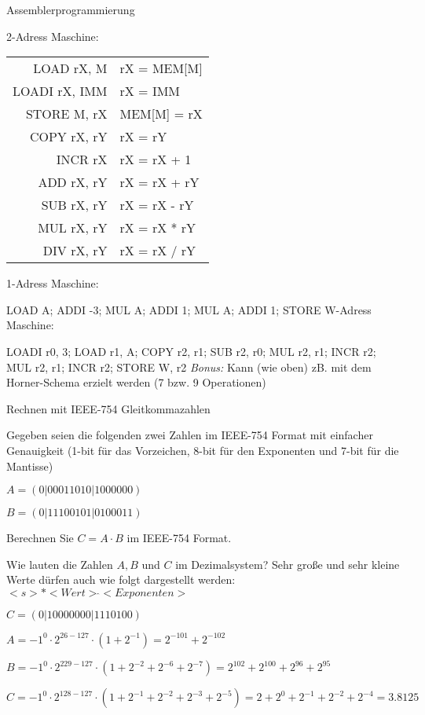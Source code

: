 \documentclass{exercisesheet}
\begin{document}
\begin{exercise}{Assemblerprogrammierung}
\begin{multicols}{2}
    2-Adress Maschine:\par
    \begin{tabular}{|r|l|}
      \hline
      LOAD rX, M    & rX = MEM[M]  \\
      LOADI rX, IMM & rX = IMM     \\
      STORE M, rX   & MEM[M] = rX  \\
      COPY rX, rY   & rX = rY      \\
      INCR rX       & rX = rX + 1  \\
      ADD rX, rY    & rX = rX + rY \\
      SUB rX, rY    & rX = rX - rY \\
      MUL rX, rY    & rX = rX * rY \\
      DIV rX, rY    & rX = rX / rY \\
      \hline
    \end{tabular}
  \end{multicols}

  \begin{solution}
    1-Adress Maschine:\par LOAD A; ADDI -3; MUL A; ADDI 1; MUL A; ADDI 1; STORE W-Adress Maschine:\par LOADI r0, 3; LOAD r1, A; COPY r2, r1; SUB r2, r0; MUL r2, r1; INCR r2; MUL r2, r1; INCR r2; STORE W, r2\newline
    \textit{Bonus:} Kann (wie oben) zB. mit dem Horner-Schema erzielt werden (7 bzw. 9 Operationen)
  \end{solution}
\end{exercise}

\begin{eexercises}[4]{Rechnen mit IEEE-754 Gleitkommazahlen}{
    Gegeben seien die folgenden zwei Zahlen im IEEE-754 Format mit einfacher Genauigkeit (1-bit für das Vorzeichen, 8-bit für den Exponenten und 7-bit für die Mantisse)\par
    \centering $A = (0|00011010|1000000)$\par $B = (0|11100101|0100011)$
  }
  \item Berechnen Sie $C = A \cdot B$ im IEEE-754 Format.
  \item Wie lauten die Zahlen $A, B$ und $C$ im Dezimalsystem? Sehr große und sehr kleine Werte dürfen auch wie folgt dargestellt werden: $<s>*<Wert> \hat{} <Exponenten>$
\end{eexercises}

\begin{solutions}
  \item $C = (0|10000000|1110100)$
  \item
  $A = {-1}^0 \cdot 2^{26-127} \cdot (1+2^{-1}) = 2^{-101} + 2^{-102}$\par
  $B = {-1}^0 \cdot 2^{229-127} \cdot (1+2^{-2}+2^{-6}+2^{-7}) = 2^{102} + 2^{100} + 2^{96} + 2^{95}$\par
  $C = {-1}^0 \cdot 2^{128-127} \cdot (1+2^{-1}+2^{-2}+2^{-3}+2^{-5}) = 2 + 2^0 + 2^{-1} + 2^{-2} + 2^{-4} = 3.8125$
\end{solutions}
\end{document}
